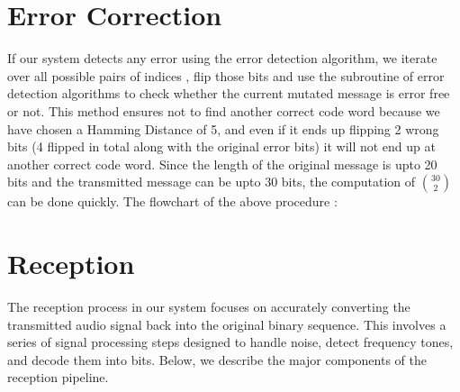 \documentclass[11pt]{article}
\begin{document}
\section{Error Correction}
If our system detects any error using the error detection algorithm, we iterate over all possible pairs of indices , flip those bits and use the subroutine of error detection algorithms to check whether the current mutated message is error free or not. This method ensures not to find another correct code word because we have chosen a Hamming Distance of 5, and even if it ends up flipping 2 wrong bits (4 flipped in total along with the original error bits) it will not end up at another correct code word.  Since the length of the original message is upto 20 bits and the transmitted message can be upto 30 bits, the computation of \( \binom{30}{2} \) can be done quickly. The flowchart of the above procedure : 
\begin{center}
\end{center}
\section{Reception}

The reception process in our system focuses on accurately converting the transmitted audio signal back into the original binary sequence. This involves a series of signal processing steps designed to handle noise, detect frequency tones, and decode them into bits. Below, we describe the major components of the reception pipeline.
\end{document}
